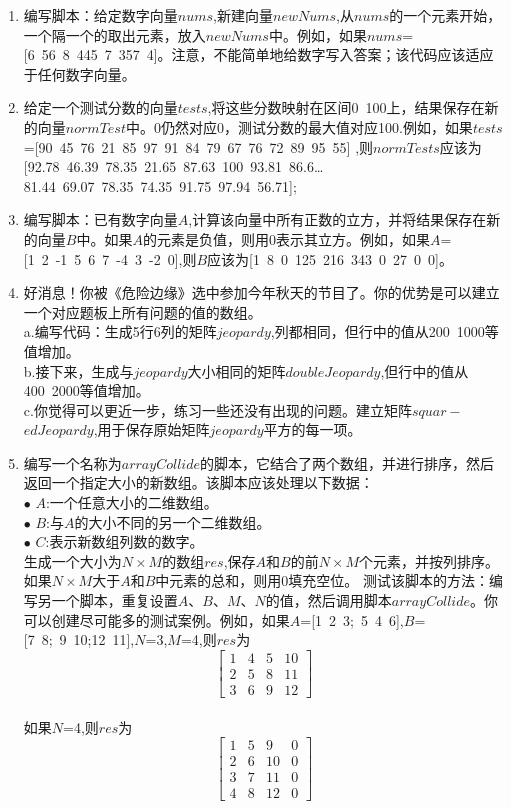 \documentclass[UTF8]{ctexart}
\begin{document}
\begin{enumerate}
	\item 编写脚本：给定数字向量$nums$,新建向量$newNums$,从$nums$的一个元素开始，一个隔一个的取出元素，放入$newNums$中。例如，如果$nums$=[6\ 56\ 8\ 445\ 7\ 357\ 4]。注意，不能简单地给数字写入答案；该代码应该适应于任何数字向量。
	\item 给定一个测试分数的向量$tests$,将这些分数映射在区间0~100上，结果保存在新的向量$normTest$中。0仍然对应0，测试分数的最大值对应100.例如，如果$tests$=[90\ 45\ 76\ 21\ 85\ 97\ 91\ 84\ 79\ 67\ 76\ 72\ 89\ 95\ 55] ,则$normTests$应该为[92.78\ 46.39\ 78.35\ 21.65\ 87.63\ 100\ 93.81\ 86.6\dots81.44\ 69.07\ 78.35\ 74.35\ 91.75\ 97.94\ 56.71];
	\item 编写脚本：已有数字向量$A$,计算该向量中所有正数的立方，并将结果保存在新的向量$B$中。如果$A$的元素是负值，则用0表示其立方。例如，如果$A$=[1\ 2\ -1\ 5\ 6\ 7\ -4\ 3\ -2\ 0],则$B$应该为[1\ 8\ 0\ 125\ 216\ 343\ 0\ 27\ 0\ 0]。
	\item 好消息！你被《危险边缘》选中参加今年秋天的节目了。你的优势是可以建立一个对应题板上所有问题的值的数组。
	\\a.编写代码：生成5行6列的矩阵$jeopardy$,列都相同，但行中的值从200~1000等值增加。
	\\b.接下来，生成与$jeopardy$大小相同的矩阵$doubleJeopardy$,但行中的值从400~2000等值增加。
	\\c.你觉得可以更近一步，练习一些还没有出现的问题。建立矩阵$squar-$ $edJeopardy$,用于保存原始矩阵$jeopardy$平方的每一项。
	\item 编写一个名称为$arrayCollide$的脚本，它结合了两个数组，并进行排序，然后返回一个指定大小的新数组。该脚本应该处理以下数据：\\
	$\bullet$ $A$:一个任意大小的二维数组。\\
	$\bullet$ $B$:与$A$的大小不同的另一个二维数组。\\
	$\bullet$ $C$:表示新数组列数的数字。\\
	\text{\qquad } 生成一个大小为$N\times M$的数组$res$,保存$A$和$B$的前$N\times M$个元素，并按列排序。如果$N\times M$大于$A$和$B$中元素的总和，则用0填充空位。
	\text{\qquad} 测试该脚本的方法：编写另一个脚本，重复设置$A\text{、}B\text{、}M\text{、}N$的值，然后调用脚本$arrayCollide$。你可以创建尽可能多的测试案例。例如，如果$A$=[1\ 2\ 3;\ 5\ 4\ 6],$B$=[7\ 8;\ 9\ 10;12\ 11],$N$=3,$M$=4,则$res$为
	$$\begin{bmatrix}
	1&4&5&10\\2&5&8&11\\3&6&9&12
	\end{bmatrix}
	$$
	\\如果$N$=4,则$res$为
	$$
	\begin{bmatrix}
	1&5&9&0\\2&6&10&0\\3&7&11&0\\4&8&12&0
	\end{bmatrix}
	$$ \\
\end{enumerate}
\end{document}
